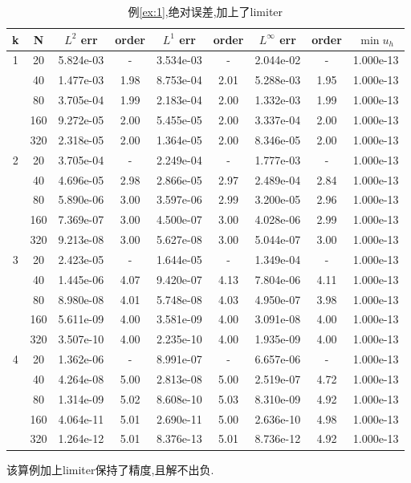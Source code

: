 \documentclass[a4paper, 11pt]{ctexart}
\numberwithin{equation}{section}
\numberwithin{figure}{section}
\begin{document}
\begin{table}[H]
  \centering
  \begin{tabular}{c|c|c|c|c|c|c|c|c} \toprule
 k  &  N &  $L^2$ err& order&$L^1$ err  &order & $L^\infty$ err&order& $\min u_h$ \\ \midrule
 \multirow{5}{*}{1}& 20 & 5.824e-03 &  -   & 3.534e-03 &  -   & 2.044e-02 &  -   & 1.000e-13\\
                   & 40 & 1.477e-03 & 1.98 & 8.753e-04 & 2.01 & 5.288e-03 & 1.95 & 1.000e-13\\
                   & 80 & 3.705e-04 & 1.99 & 2.183e-04 & 2.00 & 1.332e-03 & 1.99 &1.000e-13\\
                   &160 & 9.272e-05 & 2.00 & 5.455e-05 & 2.00 & 3.337e-04 & 2.00 &1.000e-13\\
                   &320 & 2.318e-05 & 2.00 & 1.364e-05 & 2.00 & 8.346e-05 & 2.00 &1.000e-13\\ \midrule
 \multirow{5}{*}{2}& 20 & 3.705e-04 &  -   & 2.249e-04 &  -   & 1.777e-03 &  - &1.000e-13\\
                   & 40 & 4.696e-05 & 2.98 & 2.866e-05 & 2.97 & 2.489e-04 & 2.84 &1.000e-13\\
                   & 80 & 5.890e-06 & 3.00 & 3.597e-06 & 2.99 & 3.200e-05 & 2.96 &1.000e-13\\
                   &160 & 7.369e-07 & 3.00 & 4.500e-07 & 3.00 & 4.028e-06 & 2.99 &1.000e-13\\
                   &320 & 9.213e-08 & 3.00 & 5.627e-08 & 3.00 & 5.044e-07 & 3.00 &1.000e-13\\ \midrule
 \multirow{5}{*}{3}& 20 & 2.423e-05 &  -   & 1.644e-05 &  -   & 1.349e-04 &  - &1.000e-13\\
                   & 40 & 1.445e-06 & 4.07 & 9.420e-07 & 4.13 & 7.804e-06 & 4.11 &1.000e-13\\
                   & 80 & 8.980e-08 & 4.01 & 5.748e-08 & 4.03 & 4.950e-07 & 3.98 &1.000e-13\\
                   &160 & 5.611e-09 & 4.00 & 3.581e-09 & 4.00 & 3.091e-08 & 4.00 &1.000e-13\\
                   &320 & 3.507e-10 & 4.00 & 2.235e-10 & 4.00 & 1.935e-09 & 4.00 &1.000e-13\\ \midrule
 \multirow{5}{*}{4}& 20 & 1.362e-06 &  -   & 8.991e-07 &  -   & 6.657e-06 &  - &1.000e-13\\
                   & 40 & 4.264e-08 & 5.00 & 2.813e-08 & 5.00 & 2.519e-07 & 4.72 &1.000e-13\\
                   & 80 & 1.314e-09 & 5.02 & 8.608e-10 & 5.03 & 8.310e-09 & 4.92 &1.000e-13\\
                   &160 & 4.064e-11 & 5.01 & 2.690e-11 & 5.00 & 2.636e-10 & 4.98 &1.000e-13\\
                   &320 & 1.264e-12 & 5.01 & 8.376e-13 & 5.01 & 8.736e-12 & 4.92 &1.000e-13\\ \bottomrule
  \end{tabular}
  \caption{例\ref{ex:1},绝对误差,加上了limiter}
\end{table}
该算例加上limiter保持了精度,且解不出负.
\end{document}
